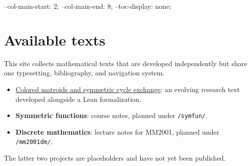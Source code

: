 
\begin{cssvars}
  --col-main-start: 2;
  --col-main-end: 8;
  --toc-display: none;
\end{cssvars}

\section[availableTexts]{Available texts}

This site collects mathematical texts that are developed independently but
share one typesetting, bibliography, and navigation system.

\begin{itemize}
\item \href{colored-matroids/index.htm}{Colored matroids and symmetric cycle
exchange}: an evolving research text developed alongside a Lean
formalization.
\item \textbf{Symmetric functions}: course notes, planned under
\texttt{/symfun/}.
\item \textbf{Discrete mathematics}: lecture notes for MM2001, planned under
\texttt{/mm2001dm/}.
\end{itemize}

The latter two projects are placeholders and have not yet been published.

